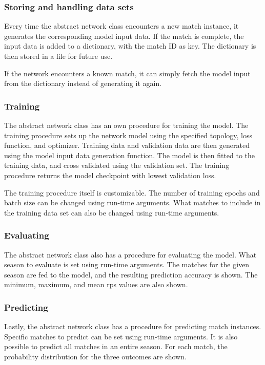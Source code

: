 \subsubsection{Storing and handling data sets}

Every time the abstract network class encounters a new match instance, it generates the corresponding model input data. If the match is complete, the input data is added to a dictionary, with the match ID as key. The dictionary is then stored in a file for future use.

If the network encounters a known match, it can simply fetch the model input from the dictionary instead of generating it again.

\subsubsection{Training}

The abstract network class has an own procedure for training the model. The training procedure sets up the network model using the specified topology, loss function, and optimizer. Training data and validation data are then generated using the model input data generation function. The model is then fitted to the training data, and cross validated using the validation set. The training procedure returns the model checkpoint with lowest validation loss.

The training procedure itself is customizable. The number of training epochs and batch size can be changed using run-time arguments. What matches to include in the training data set can also be changed using run-time arguments.

\subsubsection{Evaluating}

The abstract network class also has a procedure for evaluating the model. What season to evaluate is set using run-time arguments. The matches for the given season are fed to the model, and the resulting prediction accuracy is shown. The minimum, maximum, and mean \gls{rps} values are also shown.

\subsubsection{Predicting}

Lastly, the abstract network class has a procedure for predicting match instances. Specific matches to predict can be set using run-time arguments. It is also possible to predict all matches in an entire season. For each match, the probability distribution for the three outcomes are shown.


